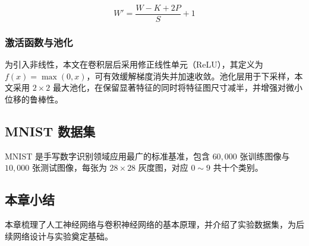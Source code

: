 \begin{equation}
W' = \frac{W - K + 2P}{S} + 1
\label{eq:convsize}
\end{equation}

\subsubsection{激活函数与池化}

为引入非线性，本文在卷积层后采用修正线性单元（ReLU）\cite{nair2010rectified}，其定义为 $f(x)=\max(0,x)$，可有效缓解梯度消失并加速收敛。池化层用于下采样，本文采用 $2\times2$ 最大池化，在保留显著特征的同时将特征图尺寸减半，并增强对微小位移的鲁棒性。

\subsection{MNIST 数据集}

MNIST 是手写数字识别领域应用最广的标准基准\cite{lecun1998gradient,deng2012mnist}，包含 $60{,}000$ 张训练图像与 $10{,}000$ 张测试图像，每张为 $28\times28$ 灰度图，对应 $0\sim9$ 共十个类别。

\subsection{本章小结}

本章梳理了人工神经网络与卷积神经网络的基本原理，并介绍了实验数据集，为后续网络设计与实验奠定基础。
